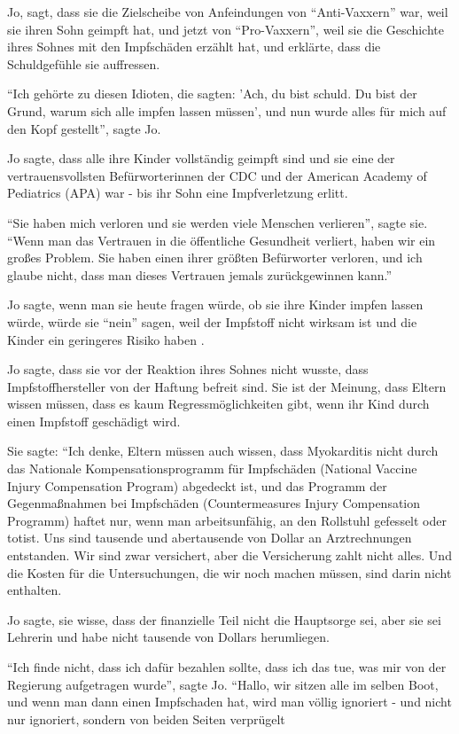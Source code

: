 Jo, sagt, dass sie die Zielscheibe von Anfeindungen von ``Anti-Vaxxern'' war,
weil sie ihren Sohn geimpft hat, und jetzt von ``Pro-Vaxxern'', weil sie die
Geschichte ihres Sohnes mit den Impfschäden erzählt hat, und erklärte, dass die
Schuldgefühle sie auffressen.

``Ich gehörte zu diesen Idioten, die sagten: 'Ach, du bist schuld. Du bist der
Grund, warum sich alle impfen lassen müssen', und nun wurde alles für mich auf
den Kopf gestellt'', sagte Jo.

Jo sagte, dass alle ihre Kinder vollständig geimpft sind und sie eine der
vertrauensvollsten Befürworterinnen der CDC und der American Academy of
Pediatrics (APA) war - bis ihr Sohn eine Impfverletzung erlitt.

``Sie haben mich verloren und sie werden viele Menschen verlieren'', sagte
sie. ``Wenn man das Vertrauen in die öffentliche Gesundheit verliert, haben wir
ein großes Problem. Sie haben einen ihrer größten Befürworter verloren, und ich
glaube nicht, dass man dieses Vertrauen jemals zurückgewinnen kann.''

Jo sagte, wenn man sie heute fragen würde, ob sie ihre Kinder impfen lassen
würde, würde sie ``nein'' sagen, weil der Impfstoff nicht wirksam ist und die
Kinder ein geringeres Risiko haben .

Jo sagte, dass sie vor der Reaktion ihres Sohnes nicht wusste, dass
Impfstoffhersteller von der Haftung befreit sind. Sie ist der Meinung, dass
Eltern wissen müssen, dass es kaum Regressmöglichkeiten gibt, wenn ihr Kind
durch einen Impfstoff geschädigt wird.

Sie sagte: ``Ich denke, Eltern müssen auch wissen, dass Myokarditis nicht durch
das Nationale Kompensationsprogramm für Impfschäden (National Vaccine Injury
Compensation Program) abgedeckt ist, und das Programm der Gegenmaßnahmen bei
Impfschäden (Countermeasures Injury Compensation Programm) haftet nur, wenn man
arbeitsunfähig, an den Rollstuhl gefesselt oder totist. Uns sind tausende und
abertausende von Dollar an Arztrechnungen entstanden. Wir sind zwar versichert,
aber die Versicherung zahlt nicht alles. Und die Kosten für die Untersuchungen,
die wir noch machen müssen, sind darin nicht enthalten.

Jo sagte, sie wisse, dass der finanzielle Teil nicht die Hauptsorge sei, aber
sie sei Lehrerin und habe nicht tausende von Dollars herumliegen.

``Ich finde nicht, dass ich dafür bezahlen sollte, dass ich das tue, was mir von
der Regierung aufgetragen wurde'', sagte Jo. ``Hallo, wir sitzen alle im selben
Boot, und wenn man dann einen Impfschaden hat, wird man völlig ignoriert - und
nicht nur ignoriert, sondern von beiden Seiten verprügelt

